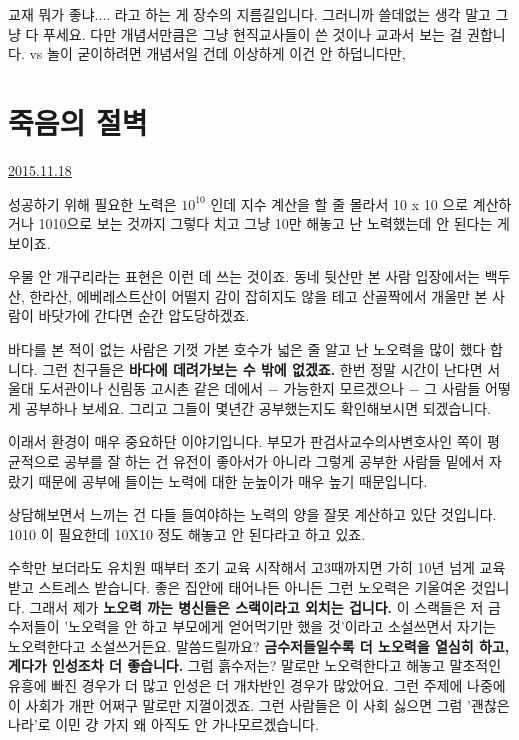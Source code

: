 교재 뭐가 좋냐.... 라고 하는 게 장수의 지름길입니다.
그러니까 쓸데없는 생각 말고 그냥 다 푸세요.
다만 개념서만큼은 그냥 현직교사들이 쓴 것이나 교과서 보는 걸 권합니다.
vs 놀이 굳이하려면 개념서일 건데 이상하게 이건 안 하덥니다만,
\vspace{5mm}








\section{죽음의 절벽}
\href{https://www.kockoc.com/Apoc/497307}{2015.11.18}

\vspace{5mm}

성공하기 위해 필요한 노력은 $10^10$  인데
지수 계산을 할 줄 몰라서 10 x 10 으로 계산하거나
1010으로 보는 것까지 그렇다 치고 그냥 10만 해놓고 난 노력했는데 안 된다는 게 보이죠.
\vspace{5mm}

우물 안 개구리라는 표현은 이런 데 쓰는 것이죠.
동네 뒷산만 본 사람 입장에서는 백두산, 한라산, 에베레스트산이 어떨지 감이 잡히지도 않을 테고
산골짝에서 개울만 본 사람이 바닷가에 간다면 순간 압도당하겠죠.
\vspace{5mm}

바다를 본 적이 없는 사람은 기껏 가본 호수가 넓은 줄 알고 난 노오력을 많이 했다 합니다.
그런 친구들은 \textbf{바다에 데려가보는 수 밖에 없겠죠.}
한번 정말 시간이 난다면 서울대 도서관이나 신림동 고시촌 같은 데에서 $-$ 가능한지 모르겠으나 $-$ 그 사람들 어떻게 공부하나 보세요.
그리고 그들이 몇년간 공부했는지도 확인해보시면 되겠습니다.
\vspace{5mm}

이래서 환경이 매우 중요하단 이야기입니다.
부모가 판검사교수의사변호사인 쪽이 평균적으로 공부를 잘 하는 건 유전이 좋아서가 아니라
그렇게 공부한 사람들 밑에서 자랐기 때문에 공부에 들이는 노력에 대한 눈높이가 매우 높기 때문입니다.
\vspace{5mm}

상담해보면서 느끼는 건 다들 들여야하는 노력의 양을 잘못 계산하고 있단 것입니다.
1010   이 필요한데 10X10 정도 해놓고 안 된다라고 하고 있죠.
\vspace{5mm}

수학만 보더라도
유치원 때부터 조기 교육 시작해서 고3때까지면 가히 10년 넘게 교육받고 스트레스 받습니다.
좋은 집안에 태어나든 아니든 그런 노오력은 기울여온 것입니다.
그래서 제가 \textbf{노오력 까는 병신들은 스랙이라고 외치는 겁니다.}
이 스랙들은 저 금수저들이 '노오력을 안 하고 부모에게 얻어먹기만 했을 것'이라고 소설쓰면서 자기는 노오력한다고 소설쓰거든요.
말씀드릴까요?
\textbf{금수저들일수록 더 노오력을 열심히 하고, 게다가 인성조차 더 좋습니다.}
그럼 흙수저는? 말로만 노오력한다고 해놓고 말초적인 유흥에 빠진 경우가 더 많고 인성은 더 개차반인 경우가 많았어요.
그런 주제에 나중에 이 사회가 개판 어쩌구 말로만 지껄이겠죠.
그런 사람들은 이 사회 싫으면 그럼 '괜찮은 나라'로 이민 걍 가지 왜 아직도 안 가나모르겠습니다.
\vspace{5mm}

